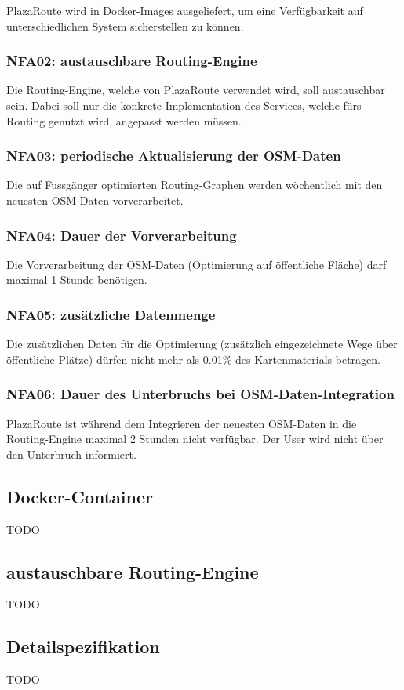 PlazaRoute wird in Docker-Images ausgeliefert, um eine Verfügbarkeit auf unterschiedlichen System sicherstellen zu können.

\subsubsection{NFA02: austauschbare Routing-Engine}
\label{NFA:NFA02}

Die Routing-Engine, welche von PlazaRoute verwendet wird, soll austauschbar sein. Dabei soll nur die konkrete Implementation des Services, welche fürs Routing genutzt wird, angepasst werden müssen.

\subsubsection{NFA03: periodische Aktualisierung der OSM-Daten}
\label{NFA:NFA03}

Die auf Fussgänger optimierten Routing-Graphen werden wöchentlich mit den neuesten \ac{OSM}-Daten vorverarbeitet.

\subsubsection{NFA04: Dauer der Vorverarbeitung}
\label{NFA:NFA04}

Die Vorverarbeitung der \ac{OSM}-Daten (Optimierung auf öffentliche Fläche) darf maximal 1 Stunde benötigen.

\subsubsection{NFA05: zusätzliche Datenmenge}
\label{NFA:NFA05}

Die zusätzlichen Daten für die Optimierung (zusätzlich eingezeichnete Wege über öffentliche Plätze) dürfen nicht mehr als 0.01\% des Kartenmaterials betragen.

\subsubsection{NFA06: Dauer des Unterbruchs bei OSM-Daten-Integration}
\label{NFA:NFA06}

PlazaRoute ist während dem Integrieren der neuesten \ac{OSM}-Daten in die Routing-Engine maximal 2 Stunden nicht verfügbar. Der User wird nicht über den Unterbruch informiert.

\subsection{Docker-Container}
\label{nfa:Docker-Container}

TODO

\subsection{austauschbare Routing-Engine}
\label{nfa:austauschbare Routing-Engine}

TODO

\subsection{Detailspezifikation}
\label{sub:Detailspezifikation}

TODO